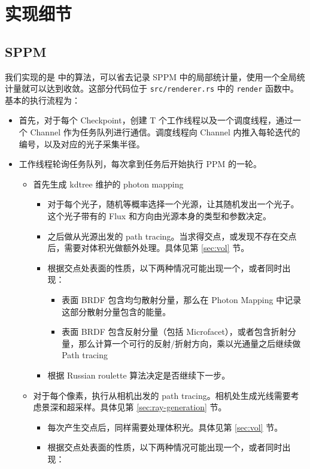 \documentclass{ctexart}
\begin{document}
\section{实现细节}
\subsection{SPPM}
我们实现的是 \cite{knaus2011progressive} 中的算法，可以省去记录 SPPM 中的局部统计量，使用一个全局统计量就可以达到收敛。这部分代码位于 \texttt{src/renderer.rs} 中的 \texttt{render} 函数中。基本的执行流程为：

\begin{itemize}
  \item 首先，对于每个 Checkpoint，创建 T 个工作线程以及一个调度线程，通过一个 Channel 作为任务队列进行通信。调度线程向 Channel 内推入每轮迭代的编号，以及对应的光子采集半径。
  \item 工作线程轮询任务队列，每次拿到任务后开始执行 PPM 的一轮。
  \begin{itemize}
    \item 首先生成 kdtree 维护的 photon mapping
    \begin{itemize}
      \item 对于每个光子，随机等概率选择一个光源，让其随机发出一个光子。这个光子带有的 Flux 和方向由光源本身的类型和参数决定。
      \item 之后做从光源出发的 path tracing。当求得交点，或发现不存在交点后，需要对体积光做额外处理。具体见第 \ref{sec:vol} 节。
      \item 根据交点处表面的性质，以下两种情况可能出现一个，或者同时出现：
      \begin{itemize}
        \item 表面 BRDF 包含均匀散射分量，那么在 Photon Mapping 中记录这部分散射分量包含的能量。
        \item 表面 BRDF 包含反射分量（包括 Microfacet），或者包含折射分量，那么计算一个可行的反射/折射方向，乘以光通量之后继续做 Path tracing
      \end{itemize}
      \item 根据 Russian roulette 算法决定是否继续下一步。
    \end{itemize}
    \item 对于每个像素，执行从相机出发的 path tracing。相机处生成光线需要考虑景深和超采样。具体见第 \ref{sec:ray-generation} 节。
    \begin{itemize}
      \item 每次产生交点后，同样需要处理体积光。具体见第 \ref{sec:vol} 节。
      \item 根据交点处表面的性质，以下两种情况可能出现一个，或者同时出现：

\end{itemize}
\end{itemize}
\end{itemize}
\end{document}
